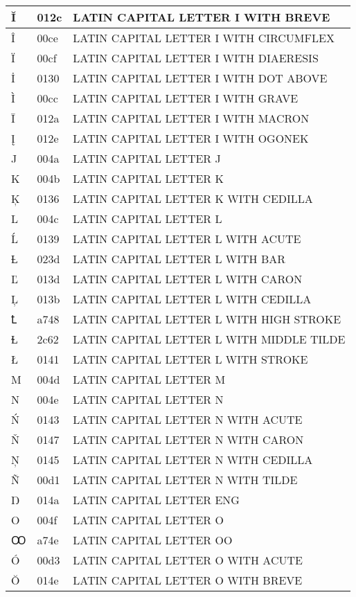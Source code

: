 \documentclass[12pt,letterpaper,openany]{book}
\begin{document}
\begin{center}
\begin{supertabular}{|m{0.25in}|m{0.5in}|m{4in}|}
Ĭ & 012c & LATIN CAPITAL LETTER I WITH BREVE\\\hline
Î & 00ce & LATIN CAPITAL LETTER I WITH CIRCUMFLEX\\\hline
Ï & 00cf & LATIN CAPITAL LETTER I WITH DIAERESIS\\\hline
İ & 0130 & LATIN CAPITAL LETTER I WITH DOT ABOVE\\\hline
Ì & 00cc & LATIN CAPITAL LETTER I WITH GRAVE\\\hline
Ī & 012a & LATIN CAPITAL LETTER I WITH MACRON\\\hline
Į & 012e & LATIN CAPITAL LETTER I WITH OGONEK\\\hline
J & 004a & LATIN CAPITAL LETTER J\\\hline
K & 004b & LATIN CAPITAL LETTER K\\\hline
Ķ & 0136 & LATIN CAPITAL LETTER K WITH CEDILLA\\\hline
L & 004c & LATIN CAPITAL LETTER L\\\hline
Ĺ & 0139 & LATIN CAPITAL LETTER L WITH ACUTE\\\hline
Ƚ & 023d & LATIN CAPITAL LETTER L WITH BAR\\\hline
Ľ & 013d & LATIN CAPITAL LETTER L WITH CARON\\\hline
Ļ & 013b & LATIN CAPITAL LETTER L WITH CEDILLA\\\hline
Ꝉ & a748 & LATIN CAPITAL LETTER L WITH HIGH STROKE\\\hline
Ɫ & 2c62 & LATIN CAPITAL LETTER L WITH MIDDLE TILDE\\\hline
Ł & 0141 & LATIN CAPITAL LETTER L WITH STROKE\\\hline
M & 004d & LATIN CAPITAL LETTER M\\\hline
N & 004e & LATIN CAPITAL LETTER N\\\hline
Ń & 0143 & LATIN CAPITAL LETTER N WITH ACUTE\\\hline
Ň & 0147 & LATIN CAPITAL LETTER N WITH CARON\\\hline
Ņ & 0145 & LATIN CAPITAL LETTER N WITH CEDILLA\\\hline
Ñ & 00d1 & LATIN CAPITAL LETTER N WITH TILDE\\\hline
Ŋ & 014a & LATIN CAPITAL LETTER ENG\\\hline
O & 004f & LATIN CAPITAL LETTER O\\\hline
Ꝏ & a74e & LATIN CAPITAL LETTER OO\\\hline
Ó & 00d3 & LATIN CAPITAL LETTER O WITH ACUTE\\\hline
Ŏ & 014e & LATIN CAPITAL LETTER O WITH BREVE\\\hline

\end{supertabular}
\end{center}
\end{document}

